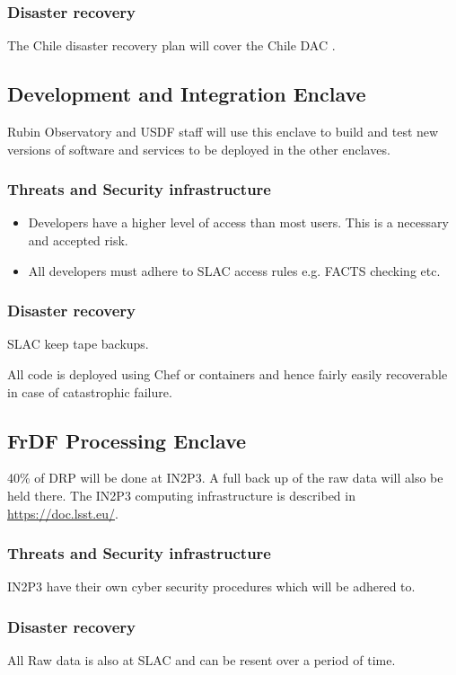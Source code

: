 \subsubsection{Disaster recovery}
The Chile disaster recovery plan will cover the Chile \gls{DAC} .

\subsection{Development and Integration  \gls{Enclave}}
Rubin Observatory and \gls{USDF} staff will use this enclave to build and test new versions of software and services to be deployed in the other enclaves.

\subsubsection{Threats and Security infrastructure}

\begin{itemize}
\item Developers have a higher level of access than most users.
This is a necessary and accepted risk.
\item All developers must adhere to  SLAC access rules e.g. FACTS checking etc.
\end{itemize}

\subsubsection{Disaster recovery}
SLAC keep tape backups.

All code is deployed using Chef or containers and hence fairly easily recoverable in case of catastrophic failure.



\subsection{FrDF Processing  \gls{Enclave}}
40\% of \gls{DRP} will be done at IN2P3.
A full back up of the raw data will also be held there.
The IN2P3 computing infrastructure is described in \url{https://doc.lsst.eu/}.
\subsubsection{Threats and Security infrastructure}
IN2P3 have their own cyber security procedures which will be adhered to.
\subsubsection{Disaster recovery}
All Raw data is also at SLAC and can be resent over a period of time.

